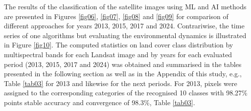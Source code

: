 \documentclass[jmse,article,submit,pdftex,moreauthors]{Definitions/mdpi}
\begin{document}
The results of the classification of the satellite images using ML and AI methods are presented in Figures \ref{fig06}, \ref{fig07}, \ref{fig08} and \ref{fig09} for comparison of different approaches for years 2013, 2015, 2017 and 2024. Contrariwise, the time series of one algorithms but evaluating the environmental dynamics is illustrated in Figure \ref{fig10}. The computed statistics on land cover class distribution by multispectral bands for each Landsat image and by years for each evaluated period (2013, 2015, 2017 and 2024) was obtained and summarised in the tables presented in the following section as well as in the Appendix of this study, e.g., Table \ref{tab03} for 2013 and likewise for the next periods. For 2013, pixels were assigned to the corresponding categories of the recognised 10 classes with 98.27\% points stable accuracy and convergence of 98.3\%, Table \ref{tab03}.
\end{document}

